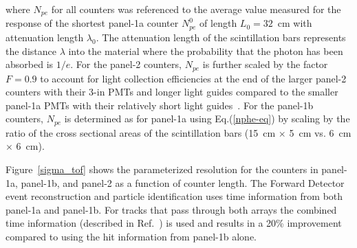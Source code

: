 \documentclass[3p,times,twocolumn]{elsarticle}
\begin{document}
\noindent
where $N_{pe}$ for all counters was referenced to the average value measured for the response of
the shortest panel-1a counter $N_{pe}^0$ of length $L_0=32$~cm with attenuation length $\lambda_0$.
The attenuation length of the scintillation bars represents the distance $\lambda$ into the material
where the probability that the photon has been absorbed is $1/e$. For the panel-2 counters, $N_{pe}$
is further scaled by the factor $F = 0.9$ to account for light collection efficiencies at the end of the
larger panel-2 counters with their 3-in PMTs and longer light guides compared to the smaller panel-1a
PMTs with their relatively short light guides~\cite{tof-nim}. For the panel-1b counters, $N_{pe}$ is
determined as for panel-1a using Eq.(\ref{nphe-eq}) by scaling by the ratio of the cross sectional areas
of the scintillation bars (15~cm $\times$ 5~cm vs. 6~cm $\times$ 6~cm). 

Figure~\ref{sigma_tof} shows the parameterized resolution for the counters in panel-1a, panel-1b,
and panel-2 as a function of counter length. The Forward Detector event reconstruction and particle
identification uses time information from both panel-1a and panel-1b. For tracks that pass through both
arrays the combined time information (described in Ref.~\cite{recon-nim}) is used and results in a 20\%
improvement compared to using the hit information from panel-1b alone.
\end{document}
